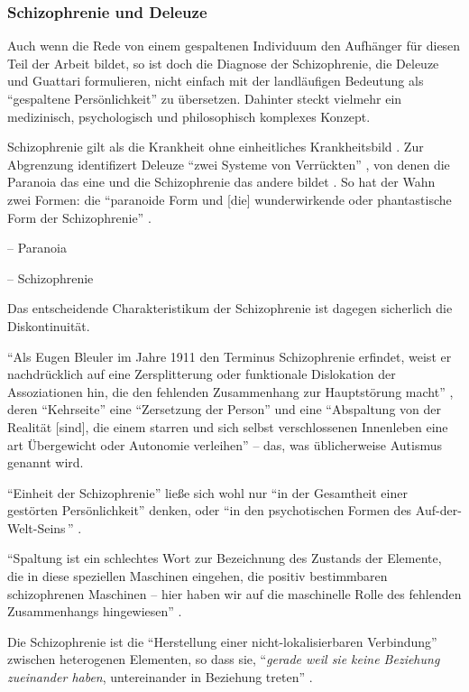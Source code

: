 \documentclass[12pt,
               DIV13,
               paper=a4,
               twoside=false,
               onehalfspacing,
               bibliography=totoc,
               toc=graduated,
               draft,
               ]{scrartcl}
\newcommand{\pc}[2]{\parencite[#1]{#2}}
\newcommand{\vgl}[2]{\parencite[vgl.][#1]{#2}}
\newcommand{\worries}[1]{\ifdraft{\textcolor{blue}{\texttt{(#1)}}}{}}
\begin{document}
\subsubsection{Schizophrenie und Deleuze}

Auch wenn die Rede von einem gespaltenen Individuum den Aufhänger für
diesen Teil der Arbeit bildet, so ist doch die Diagnose der
Schizophrenie, die Deleuze und Guattari formulieren, nicht einfach mit
der landläufigen Bedeutung als "`gespaltene Persönlichkeit"' zu
übersetzen. Dahinter steckt vielmehr ein medizinisch, psychologisch
und philosophisch komplexes Konzept.

Schizophrenie gilt als die Krankheit ohne einheitliches Krankheitsbild
\worries{vgl XYZ!}. Zur Abgrenzung identifizert Deleuze "`zwei Systeme
von Verrückten"' \pc{12}{zweisys}, von denen die Paranoia das eine und
die Schizophrenie das andere bildet \vgl{S. 14 f.}{zweisys}. So hat
der Wahn \worries{?} zwei Formen: die "`paranoide Form und [die]
wunderwirkende oder phantastische Form der Schizophrenie"' \pc{S. 21
f.}{schizg}.

-- Paranoia

-- Schizophrenie

Das entscheidende Charakteristikum der Schizophrenie ist dagegen
sicherlich die Diskontinuität.

"`Als Eugen Bleuler im Jahre 1911 den Terminus Schizophrenie erfindet,
weist er nachdrücklich auf eine Zersplitterung oder funktionale
Dislokation der Assoziationen hin, die den fehlenden Zusammenhang zur
Hauptstörung macht"' \pc{23}{schizg}, deren "`Kehrseite"' eine
"`Zersetzung der Person"' und eine "`Abspaltung von der Realität
[sind], die einem starren und sich selbst verschlossenen Innenleben
eine art Übergewicht oder Autonomie verleihen"' \pc{23}{schizg} --
das, was üblicherweise Autismus genannt wird.

"`Einheit der Schizophrenie"' ließe sich wohl nur "`in der Gesamtheit
einer gestörten Persönlichkeit"' denken, oder "`in den psychotischen
Formen des \glq Auf-der-Welt-Seins\grq\,"' \pc{24}{schizg}.

"`Spaltung ist ein schlechtes Wort zur Bezeichnung des Zustands der
Elemente, die in diese speziellen Maschinen eingehen, die positiv
bestimmbaren schizophrenen Maschinen -- hier haben wir auf die
maschinelle Rolle des fehlenden Zusammenhangs hingewiesen"'
\pc{27}{schizg}.

Die Schizophrenie ist die "`Herstellung
einer nicht-lokalisierbaren Verbindung"' \pc{19}{schizg} zwischen
heterogenen Elementen, so dass sie, "`\emph{gerade weil sie keine
Beziehung zueinander haben}, untereinander in Beziehung treten"'
\pc{19}{schizg}.
\end{document}
